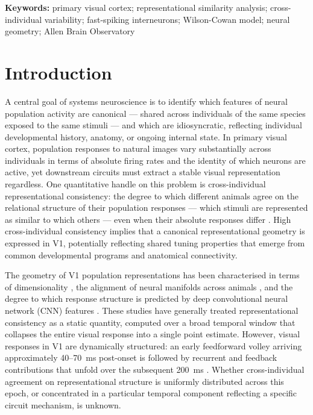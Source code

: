 \documentclass[11pt,onecolumn]{article}
\begin{document}
\noindent\textbf{Keywords:} primary visual cortex; representational
similarity analysis; cross-individual variability; fast-spiking
interneurons; Wilson-Cowan model; neural geometry; Allen Brain
Observatory

\newpage

\section{Introduction}

A central goal of systems neuroscience is to identify which features of
neural population activity are canonical --- shared across individuals of
the same species exposed to the same stimuli --- and which are
idiosyncratic, reflecting individual developmental history, anatomy, or
ongoing internal state.  In primary visual cortex, population responses
to natural images vary substantially across individuals in terms of
absolute firing rates and the identity of which neurons are active, yet
downstream circuits must extract a stable visual representation
regardless.  One quantitative handle on this problem is cross-individual
representational consistency: the degree to which different animals agree
on the relational structure of their population responses --- which
stimuli are represented as similar to which others --- even when their
absolute responses differ \citep{kriegeskorte2008}.  High cross-individual
consistency implies that a canonical representational geometry is expressed
in V1, potentially reflecting shared tuning properties that emerge from
common developmental programs and anatomical connectivity.

The geometry of V1 population representations has been characterised in
terms of dimensionality \citep{stringer2019}, the alignment of neural
manifolds across animals \citep{williams2021}, and the degree to which
response structure is predicted by deep convolutional neural network (CNN)
features \citep{yamins2016,cadena2019}.  These studies have generally
treated representational consistency as a static quantity, computed over a
broad temporal window that collapses the entire visual response into a
single point estimate.  However, visual responses in V1 are dynamically
structured: an early feedforward volley arriving approximately 40--70~ms
post-onset is followed by recurrent and feedback contributions that unfold
over the subsequent 200~ms \citep{lamme2000,girard2001}.  Whether
cross-individual agreement on representational structure is uniformly
distributed across this epoch, or concentrated in a particular temporal
component reflecting a specific circuit mechanism, is unknown.
\end{document}
